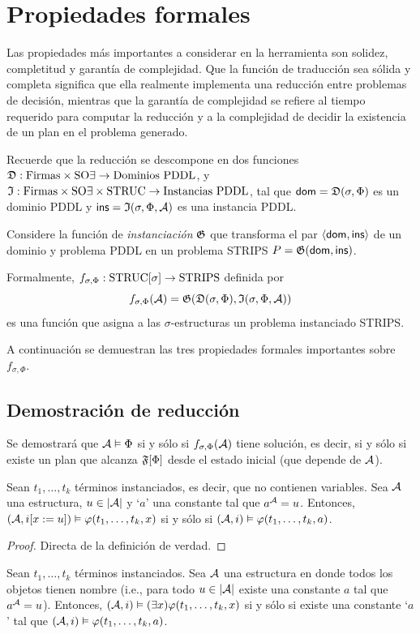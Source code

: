 \section{Propiedades formales}
Las propiedades más importantes a considerar en la herramienta son solidez,
completitud y garantía de complejidad. Que la función de traducción sea sólida
y completa significa que ella realmente implementa una reducción entre problemas de
decisión, mientras que la garantía de complejidad se refiere al tiempo
requerido para computar la reducción y a la complejidad de decidir la existencia
de un plan en el problema generado.

Recuerde que la reducción se descompone en dos funciones $\mathfrak{D} :
\text{Firmas} \times \text{SO}\exists \rightarrow \text{Dominios PDDL}$, y $\mathfrak{I} :
\text{Firmas} \times \text{SO}\exists \times \text{STRUC} \rightarrow \text{Instancias PDDL}$,
tal que $\mathsf{dom}=\mathfrak{D}(\sigma,\Phi)$ es un dominio PDDL
y $\mathsf{ins}=\mathfrak{I}(\sigma,\Phi,\mathcal{A})$ es una instancia PDDL.

Considere la función de \emph{instanciación} $\mathfrak{G}$ que transforma el par
$\langle \mathsf{dom},\mathsf{ins} \rangle$ de un dominio y problema PDDL en un problema STRIPS
$P = \mathfrak{G}(\mathsf{dom}, \mathsf{ins})$.

Formalmente, $f_{\sigma,\Phi}:\text{STRUC}[\sigma]\rightarrow\text{STRIPS}$
definida por 
\[ f_{\sigma,\Phi}(\mathcal{A}) = \mathfrak{G}(\mathfrak{D}(\sigma,\Phi),\mathfrak{I}(\sigma,\Phi,\mathcal{A})) \]
es una función que asigna a las $\sigma$-estructuras un
problema instanciado STRIPS.

A continuación se demuestran las tres propiedades formales importantes sobre
$f_{\sigma,\Phi}$.

\subsection{Demostración de reducción}
Se demostrará que $\mathcal{A} \vDash \Phi$ si y sólo si $f_{\sigma,\Phi}(\mathcal{A})$ tiene
solución, es decir, si y sólo si existe un plan que alcanza $\mathfrak{F}[\Phi]$ desde
el estado inicial (que depende de $\mathcal{A}$).

\begin{proposition}
\label{t1}
Sean $t_1,\ldots,t_k$ términos instanciados, es decir, que no contienen
variables. Sea $\mathcal{A}$ una estructura, $u\in|\mathcal{A}|$ y `$a$' una constante tal que
$a^{\mathcal{A}}=u$.
Entonces, $(\mathcal{A}, i[x:=u]) \vDash \varphi(t_1,\ldots,t_k,x)$ si y sólo si
$(\mathcal{A}, i) \vDash \varphi(t_1,\ldots,t_k,a)$.
\end{proposition}
\begin{proof}
Directa de la definición de verdad.
\end{proof}
\begin{corollary}
\label{corolario}
Sean $t_1,\ldots,t_k$ términos instanciados. Sea $\mathcal{A}$ una
estructura en donde todos los objetos tienen nombre (i.e., para todo $u\in|\mathcal{A}|$
existe una constante $a$ tal que $a^{\mathcal{A}}=u$). Entonces,
$(\mathcal{A}, i) \vDash (\exists x) \varphi(t_1,\ldots,t_k,x)$ si y sólo si
existe una constante `$a$' tal que $(\mathcal{A}, i) \vDash \varphi(t_1,\ldots,t_k,a)$.
\end{corollary}

